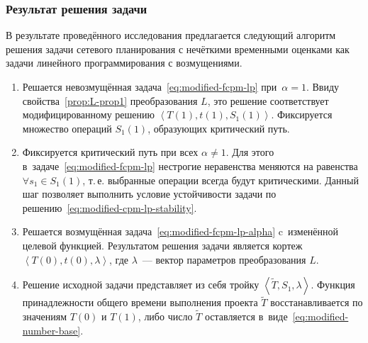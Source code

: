 \documentclass[12pt]{beamer}
\begin{document}
\begin{frame}
  \frametitle{Результат решения задачи}
  В результате проведённого исследования предлагается следующий алгоритм решения задачи сетевого планирования с нечёткими временными оценками как задачи линейного программирования с возмущениями.
\begin{enumerate}
  \item Решается невозмущённая задача~\eqref{eq:modified-fcpm-lp} при~$\alpha=1$. Ввиду свойства~\ref{prop:L-prop1} преобразования $L$, это решение соответствует модифицированному решению $\left \langle T\left(1\right), t\left(1\right), S_1\left(1\right) \right \rangle$. Фиксируется множество операций $S_1\left(1\right)$, образующих критический путь.
  \item Фиксируется критический путь при всех $\alpha \neq 1$. Для этого в~задаче~\eqref{eq:modified-fcpm-lp} нестрогие неравенства меняются на равенства $\forall s_1 \in S_1\left(1\right)$, т.\,е. выбранные операции всегда будут критическими. Данный шаг позволяет выполнить условие устойчивости задачи по решению~\eqref{eq:modified-cpm-lp-stability}.
  \item Решается возмущённая задача~\eqref{eq:modified-fcpm-lp-alpha} c~изменённой целевой функцией. Результатом решения задачи является кортеж $\left \langle T\left(0\right), t\left(0\right), \lambda \right \rangle$, где $\lambda$~--- вектор параметров преобразования $L$.
  \item Решение исходной задачи представляет из себя тройку $\left \langle \tilde T, S_1, \lambda \right \rangle$. Функция принадлежности общего времени выполнения проекта $\tilde T$ восстанавливается по значениям $T\left(0\right)$ и $T\left(1\right)$, либо число $\tilde T$ оставляется в~виде~\eqref{eq:modified-number-base}.
\end{enumerate}
\end{frame}
\end{document}
